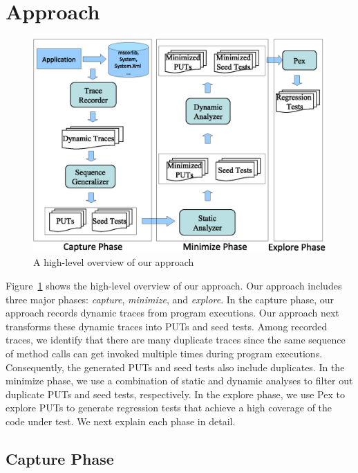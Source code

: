 \section{Approach}
\label{sec:approach}

\begin{figure}[t]
\centering
\includegraphics[scale=0.66,clip]{figs/approach1.eps}\vspace*{-1ex}
\caption{A high-level overview of our approach} \label{fig:overview}
\end{figure}

Figure~\ref{fig:overview} shows the high-level overview of our approach. Our approach includes three major phases: \emph{capture}, \emph{minimize}, and \emph{explore}. In the
capture phase, our approach records dynamic traces from program executions. Our approach next transforms these dynamic traces into PUTs and seed tests. Among recorded traces, we identify that there are many duplicate traces since the same sequence of method calls can get invoked multiple times during program executions. Consequently,
the generated PUTs and seed tests also include duplicates. In the minimize phase, we use a combination of static and dynamic analyses to filter out duplicate PUTs and seed tests, respectively. In the explore phase, we use Pex to explore PUTs to generate regression tests that achieve a high coverage of the code under test. We next explain each phase in detail.

\subsection{Capture Phase}
\label{sec:capture}

